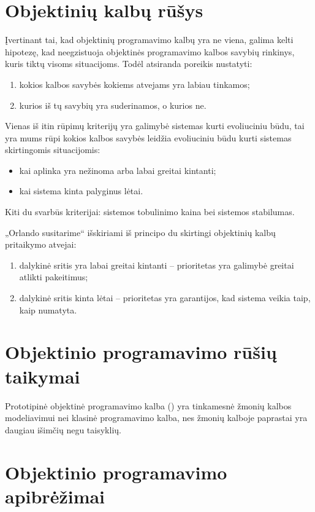 \section{Objektinių kalbų rūšys}

Įvertinant tai, kad objektinių programavimo kalbų yra ne viena,
galima kelti hipotezę, kad neegzistuoja objektinės programavimo
kalbos savybių rinkinys, kuris tiktų visoms situacijoms. Todėl
atsiranda poreikis nustatyti:
\begin{enumerate}
  \item kokios kalbos savybės kokiems atvejams yra labiau tinkamos;
  \item kurios iš tų savybių yra suderinamos, o kurios ne.
\end{enumerate}
Vienas iš itin rūpimų kriterijų yra galimybė sistemas kurti evoliuciniu
būdu, tai yra mums rūpi kokios kalbos savybės leidžia evoliuciniu
būdu kurti sistemas skirtingomis situacijomis:
\begin{itemize}
  \item kai aplinka yra nežinoma arba labai greitai kintanti;
  \item kai sistema kinta palyginus lėtai.
\end{itemize}
Kiti du svarbūs kriterijai: sistemos tobulinimo kaina bei sistemos
stabilumas.

„Orlando susitarime“ išskiriami iš principo du skirtingi objektinių
kalbų pritaikymo atvejai:
\begin{enumerate}
  \item dalykinė sritis yra labai greitai kintanti – prioritetas yra
    galimybė greitai atlikti pakeitimus;
  \item dalykinė sritis kinta lėtai – prioritetas yra garantijos,
    kad sistema veikia taip, kaip numatyta.
\end{enumerate}

\section{Objektinio programavimo rūšių taikymai}

Prototipinė objektinė programavimo kalba () yra
tinkamesnė žmonių kalbos modeliavimui nei klasinė programavimo
kalba, nes žmonių kalboje paprastai yra daugiau išimčių negu
taisyklių.

\section{Objektinio programavimo apibrėžimai}

